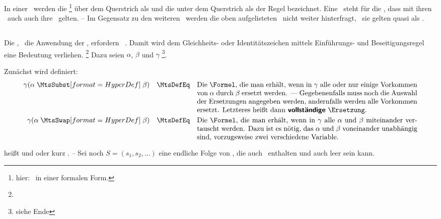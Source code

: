 In einer \Schlussregel\ werden die \Formeln%
\footnote{hier: \Aussagen\ in einer formalen Form.}
über dem Querstrich als  und die unter dem Querstrich als  der Regel bezeichnet.
Eine \Schlussregel\ steht für die \Aussage, dass mit ihren \Praemissen\ auch auch ihre \Konklusionen\ gelten.
-- Im Gegensatz zu den weiteren \Schlussregeln\ werden die oben aufgelisteten \Basisregeln\ nicht weiter hinterfragt, \textdh\ sie gelten quasi als \Axiome.

\subsection[Identitätsregeln]{\Identitaetsregeln}%
\label                    {sub:Identitaetsregeln}

Die \zulaessigenTransformationen, \textdh\ die Anwendung der \Schlussregeln, erfordern \zulaessige\ \Ersetzungen.
Damit wird dem Gleichheits- oder Identitätszeichen \chrqt{\MtsEq} mittels Einführungs- und Beseitigungsregel eine Bedeutung verliehen.%
\footnote{}
Dazu seien $\alpha$, $\beta$ und $\gamma$ \vergleichbare\footnote{siehe Ende }\Formeln.

Zunächst wird definiert:
\begin{align}
	\gamma(\alpha \defSymBin{\MtsSubst} \beta) \quad \MtsDefEq \quad
	\parbox[t]{11cm}{%
		Die \Formel, die man erhält, wenn in $\gamma$ alle oder nur einige Vorkommen von $\alpha$ durch $\beta$ ersetzt werden.
		--- Gegebenenfalls muss noch die Auswahl der Ersetzungen angegeben werden, andernfalls werden alle Vorkommen ersetzt.
		Letzteres heißt dann \DefFt{vollständige} \Ersetzung.
	} \label{def:ErsetzungAlt}\\
	\gamma(\alpha \defSymBin{\MtsSwap} \beta) \quad \MtsDefEq \quad
	\parbox[t]{11cm}{%
		Die \Formel, die man erhält, wenn in $\gamma$ alle $\alpha$ und $\beta$ miteinander vertauscht werden.
		Dazu ist es nötig, das $\alpha$ und $\beta$ voneinander unabhängig sind, vorzugsweise zwei verschiedene Variable.
	} \label{def:Vertauschung}
\end{align}

\seqqt{$ \alpha \MtsSubst \beta $} heißt  und \seqqt{$ \alpha \MtsSwap \beta $}  oder kurz .
-- Sei noch $S = (s_1, s_2, ...)$ eine endliche Folge von \Ersetzungen, die auch \Vertauschungen\ enthalten und auch leer sein kann.

